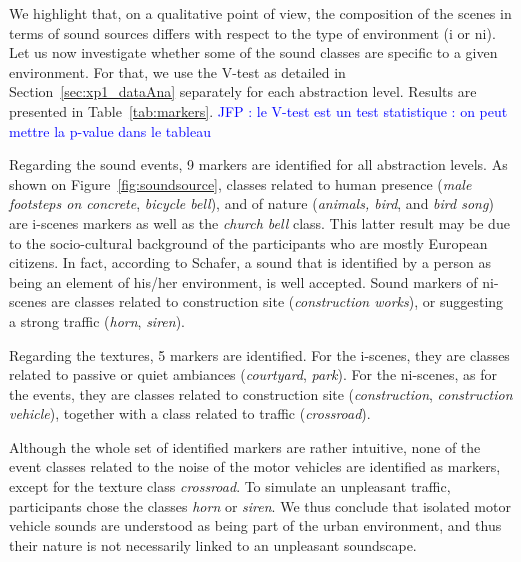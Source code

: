 \documentclass[preprint,12pt]{elsarticle}
\newcommand{\jfp}[1]{\textcolor{blue}{JFP : #1}}
\begin{document}
We highlight that, on a qualitative point of view, the composition of the scenes in terms of sound sources differs with respect to the type of environment (i or ni). Let us now investigate whether some of the sound classes are specific to a given environment. For that, we use the V-test as detailed in  Section~\ref{sec:xp1_dataAna} separately for each abstraction level. Results are presented in Table~\ref{tab:markers}. \jfp{le V-test est un test statistique : on peut mettre la p-value dans le tableau}

Regarding the sound events, 9 markers are identified for all abstraction levels. As shown on Figure~\ref{fig:soundsource}, classes related to human presence (\emph{male footsteps on concrete}, \emph{bicycle bell}), and of nature (\emph{animals, bird}, and \emph{bird song}) are i-scenes markers as well as the \emph{church bell} class. This latter result may be due to the socio-cultural background of the participants who are mostly European citizens. In fact, according to Schafer, a sound that is identified by a person as being an element of his/her environment, is well accepted. Sound markers of ni-scenes are classes related to construction site (\emph{construction works}), or suggesting a strong traffic (\emph{horn}, \emph{siren}).

Regarding the textures, 5 markers are identified. For the i-scenes, they are classes related to passive or quiet ambiances (\emph{courtyard}, \emph{park}). For the ni-scenes, as for the events, they are classes related to construction site (\emph{construction}, \emph{construction vehicle}), together with a class related to traffic (\emph{crossroad}).

Although the whole set of identified markers are rather intuitive, none of the event classes related to the noise of the motor vehicles are identified as markers, except for the texture class \emph{crossroad}. To simulate an unpleasant traffic, participants chose the classes \emph{horn} or \emph{siren}. We thus conclude that isolated motor vehicle sounds are understood as being part of the urban environment, and thus their nature is not necessarily linked to an unpleasant soundscape.
\end{document}
